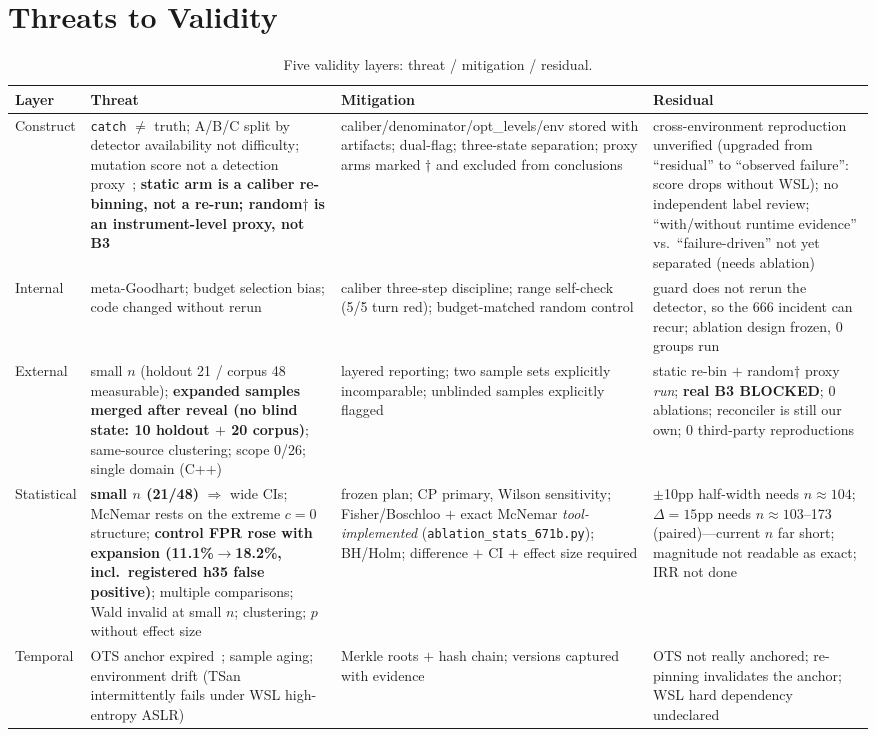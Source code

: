 \documentclass{article}
\begin{document}
\section{Threats to Validity}
\label{sec:validity}
\begin{table}[t]
\caption{Five validity layers: threat / mitigation / residual.}
\label{tab:validity}
\centering
\small
\begin{tabular}{@{}p{1.8cm}p{4.4cm}p{4.0cm}p{3.6cm}@{}}
\toprule
Layer & Threat & Mitigation & Residual \\
\midrule
Construct & \texttt{catch} $\neq$ truth; A/B/C split by detector availability not difficulty; mutation score not a detection proxy~\cite{just2014mutants}; \textbf{static arm is a caliber re-binning, not a re-run; random$\dagger$ is an instrument-level proxy, not B3} & caliber/denominator/opt\_levels/env stored with artifacts; dual-flag; three-state separation; proxy arms marked $\dagger$ and excluded from conclusions & cross-environment reproduction unverified (upgraded from ``residual'' to ``observed failure'': score drops without WSL); no independent label review; ``with/without runtime evidence'' vs.\ ``failure-driven'' not yet separated (needs ablation) \\
Internal & meta-Goodhart; budget selection bias; code changed without rerun & caliber three-step discipline; range self-check (5/5 turn red); budget-matched random control & guard does not rerun the detector, so the 666 incident can recur; ablation design frozen, 0 groups run \\
External & small $n$ (holdout 21 / corpus 48 measurable); \textbf{expanded samples merged after reveal (no blind state: 10 holdout $+$ 20 corpus)}; same-source clustering; scope 0/26; single domain (C++) & layered reporting; two sample sets explicitly incomparable; unblinded samples explicitly flagged & static re-bin $+$ random$\dagger$ proxy \emph{run}; \textbf{real B3 BLOCKED}; 0 ablations; reconciler is still our own; 0 third-party reproductions \\
Statistical & \textbf{small $n$ (21/48)} $\Rightarrow$ wide CIs; McNemar rests on the extreme $c{=}0$ structure; \textbf{control FPR rose with expansion (11.1\%$\to$18.2\%, incl.\ registered h35 false positive)}; multiple comparisons; Wald invalid at small $n$; clustering; $p$ without effect size & frozen plan; CP primary, Wilson sensitivity; Fisher/Boschloo $+$ exact McNemar \emph{tool-implemented} (\texttt{ablation\_stats\_671b.py}); BH/Holm; difference $+$ CI $+$ effect size required & $\pm$10pp half-width needs $n\approx104$; $\Delta{=}15$pp needs $n\approx103$--173 (paired)---current $n$ far short; magnitude not readable as exact; IRR not done \\
Temporal & OTS anchor expired~\cite{opentimestamps}; sample aging; environment drift (TSan intermittently fails under WSL high-entropy ASLR) & Merkle roots $+$ hash chain; versions captured with evidence & OTS not really anchored; re-pinning invalidates the anchor; WSL hard dependency undeclared \\
\bottomrule
\end{tabular}
\end{table}
\end{document}

